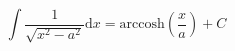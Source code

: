 $$ 
  \int \frac{1}{\sqrt{x^2 - a^2}} \mathrm{d}x
  = \mathrm{arccosh} \left ( \frac{x}{a} \right ) + C
  $$